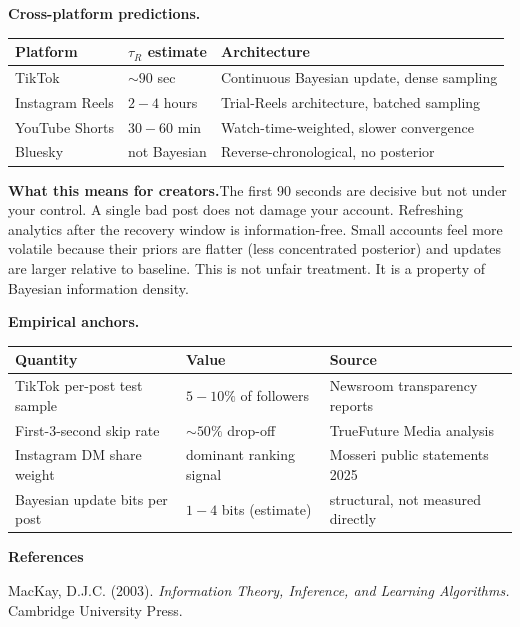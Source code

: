 \documentclass[12pt]{article}
\begin{document}
\medskip\noindent\textbf{Cross-platform predictions.}

\medskip
\begin{tabular}{lll}
\toprule
Platform & $\tau_R$ estimate & Architecture \\
\midrule
TikTok & $\sim 90$ sec & Continuous Bayesian update, dense sampling \\
Instagram Reels & $2\!-\!4$ hours & Trial-Reels architecture, batched sampling \\
YouTube Shorts & $30\!-\!60$ min & Watch-time-weighted, slower convergence \\
Bluesky & not Bayesian & Reverse-chronological, no posterior \\
\bottomrule
\end{tabular}

\bigskip

\medskip\noindent\textbf{What this means for creators.}\quad The first 90 seconds are decisive but not under your control. A single bad post does not damage your account. Refreshing analytics after the recovery window is information-free. Small accounts feel more volatile because their priors are flatter (less concentrated posterior) and updates are larger relative to baseline. This is not unfair treatment. It is a property of Bayesian information density.

\newpage

\noindent\textbf{Empirical anchors.}

\medskip
\begin{tabular}{lll}
\toprule
Quantity & Value & Source \\
\midrule
TikTok per-post test sample & $5\!-\!10\%$ of followers & Newsroom transparency reports \\
First-3-second skip rate & $\sim 50\%$ drop-off & TrueFuture Media analysis \\
Instagram DM share weight & dominant ranking signal & Mosseri public statements 2025 \\
Bayesian update bits per post & $1\!-\!4$ bits (estimate) & structural, not measured directly \\
\bottomrule
\end{tabular}

\bigskip

\noindent\textbf{References}

\medskip
\noindent[1] MacKay, D.J.C. (2003). \textit{Information Theory, Inference, and Learning Algorithms.} Cambridge University Press.
\end{document}
